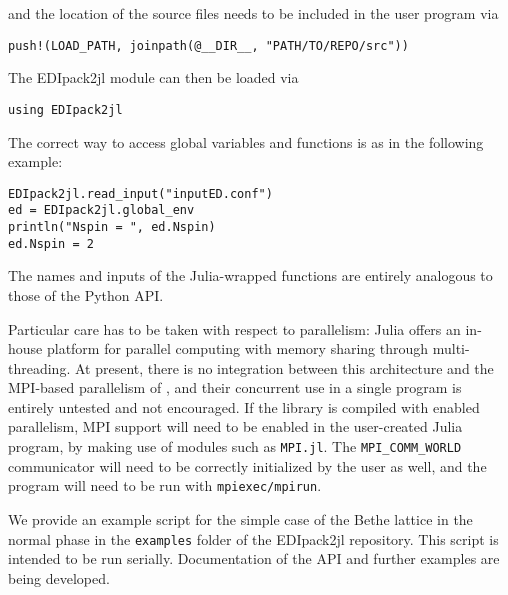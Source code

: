 \documentclass[edipack_sp.tex]{subfiles}
\begin{document}
and the location of the source files needs to be included in the user program via
\begin{lstlisting}[style=myjulia]
push!(LOAD_PATH, joinpath(@__DIR__, "PATH/TO/REPO/src"))
\end{lstlisting}

The EDIpack2jl module can then be loaded via
\begin{lstlisting}[style=myjulia]
using EDIpack2jl
\end{lstlisting}

The correct way to access global variables and functions is as in the following example:
\begin{lstlisting}[style=myjulia]
EDIpack2jl.read_input("inputED.conf")
ed = EDIpack2jl.global_env
println("Nspin = ", ed.Nspin)
ed.Nspin = 2
\end{lstlisting}

The names and inputs of the Julia-wrapped functions are entirely analogous to those of the Python API.

Particular care has to be taken with respect to parallelism: Julia offers an in-house platform for parallel computing with memory sharing through multi-threading. At present, there is no integration between this architecture and the MPI-based parallelism of \NAME{}, and their concurrent use in a single program is entirely untested and not encouraged. If the \NAME{} library is compiled with enabled parallelism, MPI support will need to be enabled in the user-created Julia program, by making use of modules such as {\tt  MPI.jl}. The {\tt MPI\_COMM\_WORLD} communicator will need to be correctly initialized by the user as well, and the program will need to be run with {\tt  mpiexec/mpirun}.

We provide an example script for the simple case of the Bethe lattice in the normal phase in the {\tt  examples} folder of the EDIpack2jl repository. This script is intended to be run serially. Documentation of the API and further examples are being developed.





\end{document}
